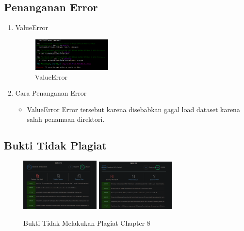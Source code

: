 \subsection{Penanganan Error}
\begin{enumerate}
	\item ValueError
	\begin{figure}[H]
		\includegraphics[width=4cm]{figures/1174017/tugas8/error/1.PNG}
		\centering
		\caption{ValueError}
	\end{figure}

	\item Cara Penanganan Error
	\begin{itemize}
		\item ValueError
		\hfill\break
		Error tersebut karena disebabkan gagal load dataset karena salah penamaan direktori.
	\end{itemize}
\end{enumerate}

\subsection{Bukti Tidak Plagiat}
\begin{figure}[H]
\centering
	\includegraphics[width=4cm]{figures/1174017/tugas8/buktiplagiat/1.PNG}
	\includegraphics[width=4cm]{figures/1174017/tugas8/buktiplagiat/2.PNG}
	\caption{Bukti Tidak Melakukan Plagiat Chapter 8}
\end{figure}

